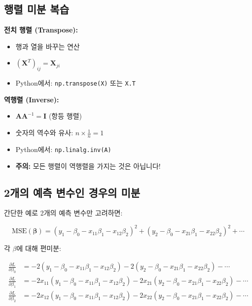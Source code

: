 \documentclass[12pt]{article}
\begin{document}
\subsection{행렬 미분 복습}

\textbf{전치 행렬 (Transpose):}
\begin{itemize}
    \item 행과 열을 바꾸는 연산
    \item $(\mathbf{X}^T)_{ij} = \mathbf{X}_{ji}$
    \item Python에서: \texttt{np.transpose(X)} 또는 \texttt{X.T}
\end{itemize}

\textbf{역행렬 (Inverse):}
\begin{itemize}
    \item $\mathbf{A}\mathbf{A}^{-1} = \mathbf{I}$ (항등 행렬)
    \item 숫자의 역수와 유사: $n \times \frac{1}{n} = 1$
    \item Python에서: \texttt{np.linalg.inv(A)}
    \item \textbf{주의:} 모든 행렬이 역행렬을 가지는 것은 아닙니다!
\end{itemize}

\subsection{2개의 예측 변수인 경우의 미분}

간단한 예로 2개의 예측 변수만 고려하면:

\begin{equation}
\text{MSE}(\boldsymbol{\beta}) = (y_1 - \beta_0 - x_{11}\beta_1 - x_{12}\beta_2)^2 + (y_2 - \beta_0 - x_{21}\beta_1 - x_{22}\beta_2)^2 + \cdots
\end{equation}

각 $\beta$에 대해 편미분:

\begin{align}
\frac{\partial L}{\partial \beta_0} &= -2(y_1 - \beta_0 - x_{11}\beta_1 - x_{12}\beta_2) - 2(y_2 - \beta_0 - x_{21}\beta_1 - x_{22}\beta_2) - \cdots \\
\frac{\partial L}{\partial \beta_1} &= -2x_{11}(y_1 - \beta_0 - x_{11}\beta_1 - x_{12}\beta_2) - 2x_{21}(y_2 - \beta_0 - x_{21}\beta_1 - x_{22}\beta_2) - \cdots \\
\frac{\partial L}{\partial \beta_2} &= -2x_{12}(y_1 - \beta_0 - x_{11}\beta_1 - x_{12}\beta_2) - 2x_{22}(y_2 - \beta_0 - x_{21}\beta_1 - x_{22}\beta_2) - \cdots
\end{align}
\end{document}
